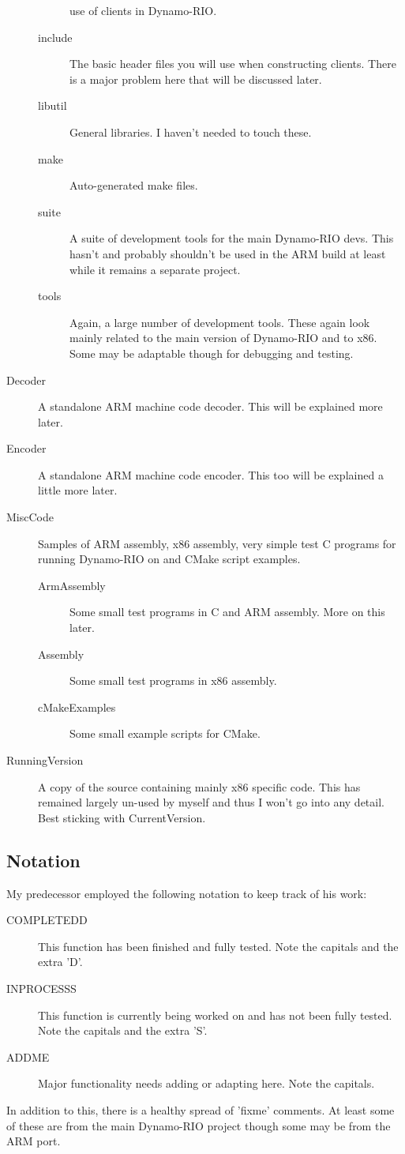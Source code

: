 \documentclass[a4paper]{article}
\begin{document}
\begin{description}
\begin{description}
use of clients in
        Dynamo-RIO.
        \item[include] The basic header files you will use when 
constructing clients.
        There is a major problem here that will be discussed later.
        \item[libutil] General libraries. I haven't needed to touch 
these.
        \item[make] Auto-generated make files.
        \item[suite] A suite of development tools for the main 
Dynamo-RIO devs. This
        hasn't and probably shouldn't be used in the ARM build at least 
while it remains
        a separate project.
        \item[tools] Again, a large number of development tools. These 
again look mainly
        related to the main version of Dynamo-RIO and to x86. Some may 
be adaptable
        though for debugging and testing.
        \end{description}
\item[Decoder] A standalone ARM machine code decoder. This will be 
explained more later.
\item[Encoder] A standalone ARM machine code encoder. This too will be explained
a little more later.
\item[MiscCode] Samples of ARM assembly, x86 assembly, very simple test 
C
programs for running Dynamo-RIO on and CMake script examples.
\begin{description}
        \item[ArmAssembly] Some small test programs in C and ARM 
assembly. More on
        this later.
        \item[Assembly] Some small test programs in x86 assembly.
        \item[cMakeExamples] Some small example scripts for CMake.
\end{description}
\item[RunningVersion] A copy of the source containing mainly x86 
specific code.
This has remained largely un-used by myself and thus I won't go into any 
detail.
Best sticking with CurrentVersion.
\end{description}

\subsection{Notation}
My predecessor employed the following notation to keep track of his work:
\begin{description}
\item[COMPLETEDD] This function has been finished and fully tested. Note the
capitals and the extra 'D'.
\item[INPROCESSS] This function is currently being worked on and has not been
fully tested. Note the capitals and the extra 'S'.
\item[ADDME] Major functionality needs adding or adapting here. Note the
capitals.
\end{description}
In addition to this, there is a healthy spread of 'fixme' comments. At least
some of these are from the main Dynamo-RIO project though some may be from the
ARM port.
\end{document}

